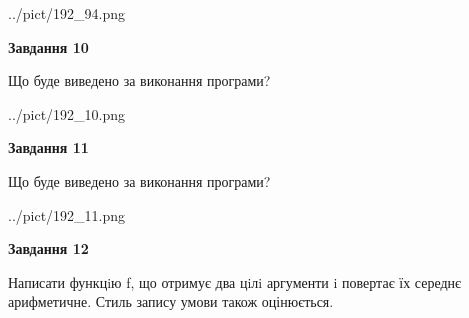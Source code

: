 \documentclass[12pt, ukrainian]{article}
\begin{document}
{\begin {large}
\begin{center}
	{../pict/192_94.png}
\end{center}
\newpage

{\begin {center}\textbf{Завдання 10}\end {center}}

Що буде виведено за виконання програми?\par
\begin{center}
	{../pict/192_10.png}
\end{center}
\newpage

{\begin {center}\textbf{Завдання 11}\end {center}}

Що буде виведено за виконання програми?\par
\begin{center}
	{../pict/192_11.png}
\end{center}
\newpage

{\begin {center}\textbf{Завдання 12}\end {center}}


Написати функцiю f, що отримує два цiлi аргументи i повертає їх середнє арифметичне. Стиль запису умови також оцінюється.\par
\newpage

\end {large}}
\end{document}
